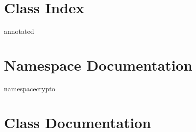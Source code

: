 


	
	\chapter{Class Index}
		{annotated}
	\chapter{Namespace Documentation}
		{namespacecrypto}
		
	\chapter{Class Documentation}
	
